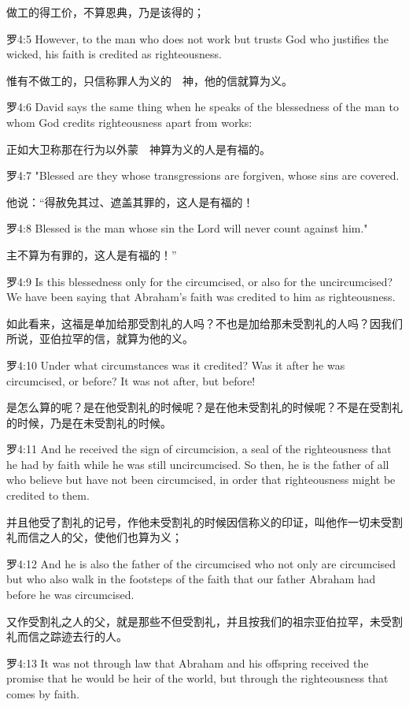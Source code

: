 \documentclass[a4paper,11pt,onecolumn,twoside]{ctexart}
\begin{document}
\begin{multicols}{2}
 做工的得工价，不算恩典，乃是该得的；


 罗4:5
 However, to the man who does not work but trusts God who justifies the wicked, his faith is credited as righteousness.

 惟有不做工的，只信称罪人为义的　神，他的信就算为义。


 罗4:6
 David says the same thing when he speaks of the blessedness of the man to whom God credits righteousness apart from works:

 正如大卫称那在行为以外蒙　神算为义的人是有福的。


 罗4:7
 "Blessed are they whose transgressions are forgiven, whose sins are covered.

 他说：“得赦免其过、遮盖其罪的，这人是有福的！


 罗4:8
 Blessed is the man whose sin the Lord will never count against him."

 主不算为有罪的，这人是有福的！”


 罗4:9
 Is this blessedness only for the circumcised, or also for the uncircumcised? We have been saying that Abraham's faith was credited to him as righteousness.

 如此看来，这福是单加给那受割礼的人吗？不也是加给那未受割礼的人吗？因我们所说，亚伯拉罕的信，就算为他的义。


 罗4:10
 Under what circumstances was it credited? Was it after he was circumcised, or before? It was not after, but before!

 是怎么算的呢？是在他受割礼的时候呢？是在他未受割礼的时候呢？不是在受割礼的时候，乃是在未受割礼的时候。


 罗4:11
 And he received the sign of circumcision, a seal of the righteousness that he had by faith while he was still uncircumcised. So then, he is the father of all who believe but have not been circumcised, in order that righteousness might be credited to them.

 并且他受了割礼的记号，作他未受割礼的时候因信称义的印证，叫他作一切未受割礼而信之人的父，使他们也算为义；


 罗4:12
 And he is also the father of the circumcised who not only are circumcised but who also walk in the footsteps of the faith that our father Abraham had before he was circumcised.

 又作受割礼之人的父，就是那些不但受割礼，并且按我们的祖宗亚伯拉罕，未受割礼而信之踪迹去行的人。


 罗4:13
 It was not through law that Abraham and his offspring received the promise that he would be heir of the world, but through the righteousness that comes by faith.


\end{multicols}
\end{document}
